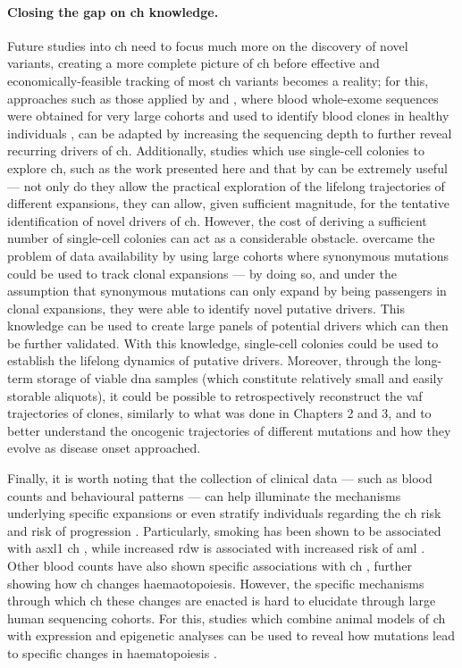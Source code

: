 \paragraph{Closing the gap on \ac{ch} knowledge.} Future studies into \ac{ch} need to focus much more on the discovery of novel variants, creating a more complete picture of \ac{ch} before effective and economically-feasible tracking of most \ac{ch} variants becomes a reality; for this, approaches such as those applied by  and , where blood whole-exome sequences were obtained for very large cohorts and used to identify blood clones in healthy individuals \cite{Jaiswal2014-rl,Genovese2014-eu}, can be adapted by increasing the sequencing depth to further reveal recurring drivers of \ac{ch}. Additionally, studies which use single-cell colonies to explore \ac{ch}, such as the work presented here and that by  can be extremely useful --- not only do they allow the practical exploration of the lifelong trajectories of different expansions, they can allow, given sufficient magnitude, for the tentative identification of novel drivers of \ac{ch}. However, the cost of deriving a sufficient number of single-cell colonies can act as a considerable obstacle.  overcame the problem of data availability by using large cohorts where synonymous mutations could be used to track clonal expansions --- by doing so, and under the assumption that synonymous mutations can only expand by being passengers in clonal expansions, they were able to identify novel putative drivers. This knowledge can be used to create large panels of potential drivers which can then be further validated. With this knowledge, single-cell colonies could be used to establish the lifelong dynamics of putative drivers. Moreover, through the long-term storage of viable \ac{dna} samples (which constitute relatively small and easily storable aliquots), it could be possible to retrospectively reconstruct the \ac{vaf} trajectories of clones, similarly to what was done in Chapters 2 and 3, and to better understand the oncogenic trajectories of different mutations and how they evolve as disease onset approached. 

Finally, it is worth noting that the collection of clinical data --- such as blood counts and behavioural patterns --- can help illuminate the mechanisms underlying specific expansions or even stratify individuals regarding the \ac{ch} risk and risk of progression \cite{Dawoud2020-af,Abelson2018-wh}. Particularly, smoking has been shown to be associated with \ac{asxl1} \ac{ch} \cite{Dawoud2020-af}, while increased \ac{rdw} is associated with increased risk of \ac{aml} \cite{Abelson2018-wh}. Other blood counts have also shown specific associations with \ac{ch} \cite{Bick2019-uj,Dawoud2020-af,Cordua2019-mo,Abelson2018-wh,Zink2017-zi,Jaiswal2014-rl,Zehir2017-gh}, further showing how \ac{ch} changes haemaotopoiesis. However, the specific mechanisms through which \ac{ch} these changes are enacted is hard to elucidate through large human sequencing cohorts. For this, studies which combine animal models of \ac{ch} with expression and epigenetic analyses can be used to reveal how mutations lead to specific changes in haematopoiesis \cite{Asada2021-wd}. 

